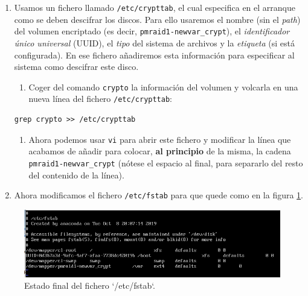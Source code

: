 \documentclass[
]{memoir}
\providecommand{\tightlist}{%
  \setlength{\itemsep}{0pt}\setlength{\parskip}{0pt}}
\begin{document}
\begin{enumerate}
\def\labelenumi{\arabic{enumi}.}
\setcounter{enumi}{11}
\item
  Usamos un fichero llamado \texttt{/etc/crypttab}, el cual especifica en el arranque como se deben descifrar los discos. Para ello usaremos el nombre (sin el \emph{path}) del volumen encriptado (es decir, \texttt{pmraid1-newvar\_crypt}), el \emph{identificador único universal} (UUID), el \emph{tipo} del sistema de archivos y la \emph{etiqueta} (si está configurada). En ese fichero añadiremos esta información para especificar al sistema como descifrar este disco.

  \begin{enumerate}
  \def\labelenumii{\alph{enumii}.}
  \tightlist
  \item
    Coger del comando \texttt{crypto} la información del volumen y volcarla en una nueva línea del fichero \texttt{/etc/crypttab}:
  \end{enumerate}

\begin{verbatim}
grep crypto >> /etc/crypttab
\end{verbatim}

  \begin{enumerate}
  \def\labelenumii{\alph{enumii}.}
  \setcounter{enumii}{1}
  \tightlist
  \item
    Ahora podemos usar \texttt{vi} para abrir este fichero y modificar la línea que acabamos de añadir para colocar, \textbf{al principio} de la misma, la cadena \texttt{pmraid1-newvar\_crypt} (nótese el espacio al final, para separarlo del resto del contenido de la línea).
  \end{enumerate}
\item
  Ahora modificamos el fichero \texttt{/etc/fstab} para que quede como en la figura \ref{fig:13h}.
\end{enumerate}

\begin{figure}

{\centering \includegraphics[width=0.8\linewidth]{images/13} 

}

\caption{Estado final del fichero `/etc/fstab`.}\label{fig:13h}
\end{figure}
\end{document}

